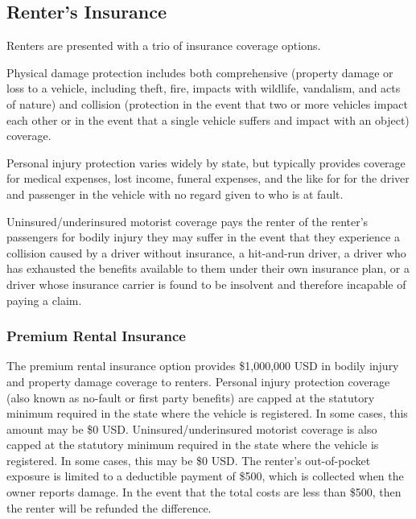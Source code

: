 \documentclass[preprint,12pt]{elsarticle}
\begin{document}
\subsection{Renter's Insurance}
Renters are presented with a trio of insurance coverage options.

Physical damage protection includes both comprehensive (property damage or loss to a vehicle, including theft, fire, impacts with wildlife,  vandalism, and acts of nature) and collision (protection in the event that two or more vehicles impact each other or in the event that a single vehicle suffers and impact with an object) coverage.

Personal injury protection varies widely by state, but typically provides coverage for medical expenses, lost income, funeral expenses, and the like for for the driver and passenger in the vehicle with no regard given to who is at fault.

Uninsured/underinsured motorist coverage pays the renter of the renter's passengers for bodily injury they may suffer in the event that they experience a collision caused by a driver without insurance, a hit-and-run driver, a driver who has exhausted the benefits available to them under their own insurance plan, or a driver whose insurance carrier is found to be insolvent and therefore incapable of paying a claim.

\subsubsection{Premium Rental Insurance}\label{premium-rental-insurance}
The premium rental insurance option provides \$1,000,000 USD in bodily injury and property damage coverage to renters. Personal injury protection coverage (also known as no-fault or first party benefits) are capped at the statutory minimum required in the state where the vehicle is registered. In some cases, this amount may be \$0 USD. Uninsured/underinsured motorist coverage is also capped at the statutory minimum required in the state where the vehicle is registered. In some cases, this may be \$0 USD. The renter's out-of-pocket exposure is limited to a deductible payment of \$500, which is collected when the owner reports damage. In the event that the total costs are less than \$500, then the renter will be refunded the difference.
\end{document}
